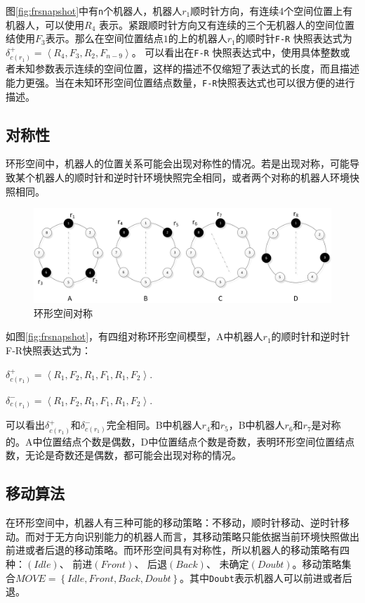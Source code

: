 图\ref{fig:frsnapshot}中有\verb|n|个机器人，机器人$r_1$顺时针方向，有连续4个空间位置上有机器人，可以使用$R_4$ 表示。紧跟顺时针方向又有连续的三个无机器人的空间位置结使用$F_3$表示。那么在空间位置结点$1$的上的机器人$r_1$的顺时针\verb|F-R| 快照表达式为$\delta_{c\left(r_1\right)}^+ = \left\langle R_4,F_3,R_2,F_{n-9}\right\rangle$。 可以看出在\verb|F-R| 快照表达式中，使用具体整数或者未知参数表示连续的空间位置，这样的描述不仅缩短了表达式的长度，而且描述能力更强。当在未知环形空间位置结点数量，\verb|F-R|快照表达式也可以很方便的进行描述。

\subsection{对称性}
环形空间中，机器人的位置关系可能会出现对称性的情况。若是出现对称，可能导致某个机器人的顺时针和逆时针环境快照完全相同，或者两个对称的机器人环境快照相同。

\begin{figure}[!hbt]
	\centering
	\includegraphics[width=3.5 in]{fig/symmetric.png}
	\caption{环形空间对称}
	\label{fig:symmetric}
\end{figure}

如图\ref{fig:frsnapshot}，有四组对称环形空间模型，A中机器人$r_1$的顺时针和逆时针F-R快照表达式为：

 $\delta_{c\left(r_1\right)}^+ = \left\langle R_1,F_2,R_1,F_1,R_1,F_2 \right\rangle.$

 $\delta_{c\left(r_1\right)}^- = \left\langle R_1,F_2,R_1,F_1,R_1,F_2 \right\rangle.$

 可以看出$\delta_{c\left(r_1\right)}^+$和$\delta_{c\left(r_1\right)}^-$完全相同。B中机器人$r_4$和$r_5$，B中机器人$r_6$和$r_7$是对称的。A中位置结点个数是偶数，D中位置结点个数是奇数，表明环形空间位置结点数，无论是奇数还是偶数，都可能会出现对称的情况。

\subsection{移动算法}
在环形空间中，机器人有三种可能的移动策略：不移动，顺时针移动、逆时针移动。而对于无方向识别能力的机器人而言，其移动策略只能依据当前环境快照做出前进或者后退的移动策略。而环形空间具有对称性，所以机器人的移动策略有四种：$\left(Idle\right)$、 前进$\left(Front\right)$、 后退$\left(Back\right)$、 未确定$\left(Doubt\right)$。移动策略集合$MOVE = \left\{Idle,Front,Back,Doubt\right\}$。其中\verb|Doubt|表示机器人可以前进或者后退。

